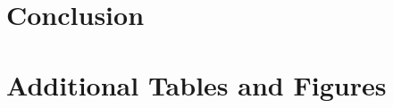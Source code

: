 \documentclass[a4paper, 12pt]{article}
\begin{document}
\section{Conclusion}
\label{sec:conclusion}



\newpage
\singlespacing                  %
\printbibliography

\newpage
\appendix
\section{Additional Tables and Figures}
\label{app:tables}
\end{document}
